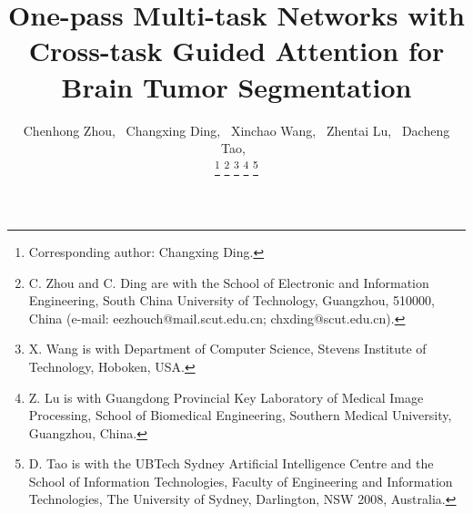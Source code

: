 \documentclass[journal,twoside]{IEEEtran}
\begin{document}
\title{One-pass Multi-task Networks with Cross-task Guided Attention for Brain Tumor Segmentation}

\author{Chenhong Zhou,~\IEEEmembership{}
        Changxing Ding,~\IEEEmembership{}
        Xinchao Wang,~\IEEEmembership{}
        Zhentai Lu,~\IEEEmembership{}
        Dacheng Tao,~\IEEEmembership{}   
        
\thanks{Corresponding author: Changxing Ding.}  
\thanks{
 C. Zhou and C. Ding are with the School of Electronic and Information Engineering, South China University of Technology, Guangzhou, 510000, China (e-mail: eezhouch@mail.scut.edu.cn; chxding@scut.edu.cn).}
\thanks{X. Wang is with Department of Computer Science, Stevens Institute of Technology, Hoboken, USA.}
\thanks{Z. Lu is with Guangdong Provincial Key Laboratory of Medical Image Processing, School of Biomedical Engineering, Southern Medical University, Guangzhou, China.}
\thanks{D. Tao is with the UBTech Sydney Artificial Intelligence Centre and the School of Information Technologies, Faculty of Engineering and Information Technologies, The University of Sydney, Darlington, NSW 2008, Australia.}
}





\maketitle
\end{document}

